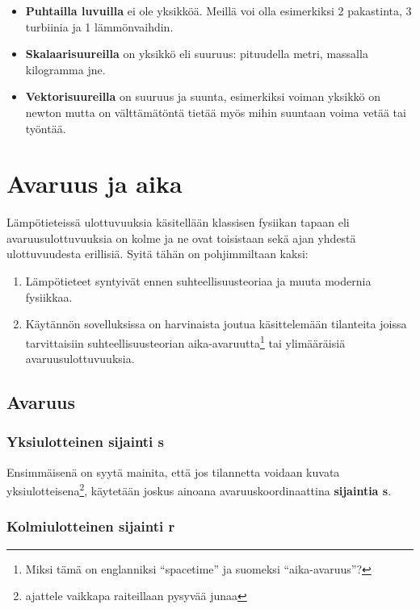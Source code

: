 \documentclass[12pt,a4paper,finnish]{book}
\begin{document}
\begin{itemize}
 \item \textbf{Puhtailla luvuilla} ei ole yksikköä. Meillä voi olla esimerkiksi 2 pakastinta, 3 turbiinia ja 1 lämmönvaihdin.
 \item \textbf{Skalaarisuureilla} on yksikkö eli suuruus: pituudella metri, massalla kilogramma jne.
 \item \textbf{Vektorisuureilla} on suuruus ja suunta, esimerkiksi voiman yksikkö on newton mutta on välttämätöntä 
 tietää myös mihin suuntaan voima vetää tai työntää.
\end{itemize}


\section{Avaruus ja aika} %

Lämpötieteissä ulottuvuuksia käsitellään klassisen fysiikan tapaan eli avaruusulottuvuuksia on kolme ja ne ovat 
toisistaan sekä ajan yhdestä ulottuvuudesta erillisiä. Syitä tähän on pohjimmiltaan kaksi:

\begin{enumerate}
 \item Lämpötieteet syntyivät ennen suhteellisuusteoriaa ja muuta modernia fysiikkaa.
 \item Käytännön sovelluksissa on harvinaista joutua käsittelemään tilanteita joissa tarvittaisiin 
 suhteellisuusteorian aika-avaruutta\footnote{Miksi tämä on englanniksi ``spacetime'' ja suomeksi ``aika-avaruus''?}
 tai ylimääräisiä avaruusulottuvuuksia.
\end{enumerate}

\subsection{Avaruus}

\subsubsection{Yksiulotteinen sijainti s}

Ensimmäisenä on syytä mainita, että jos tilannetta voidaan kuvata yksiulotteisena\footnote{ajattele vaikkapa 
raiteillaan pysyvää junaa}, käytetään joskus ainoana avaruuskoordinaattina \textbf{sijaintia s}.

\subsubsection{Kolmiulotteinen sijainti r}
\end{document}
